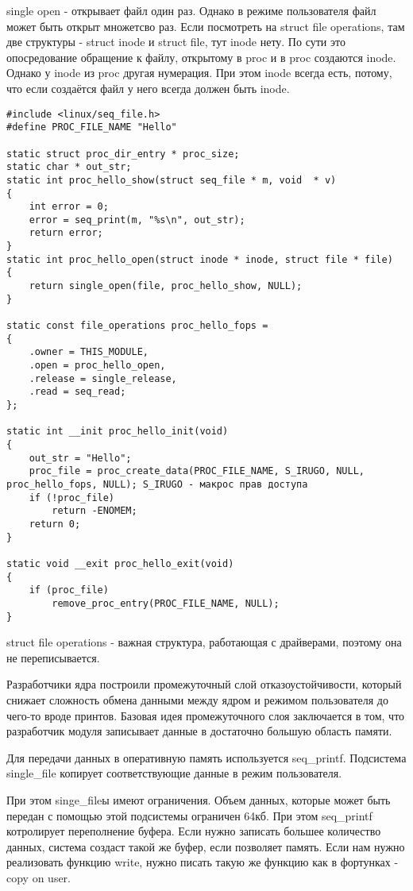 single open - открывает файл один раз. Однако в режиме пользователя файл может быть открыт множетсво раз. Если посмотреть на struct file operations, там две структуры - struct inode и struct file, тут inode нету. По сути это опосредование обращение к файлу, открытому в proc и в proc создаются inode. Однако у inode из proc другая нумерация. При этом inode всегда есть, потому, что если создаётся файл у него всегда должен быть inode.

\begin{lstlisting}
#include <linux/seq_file.h>
#define PROC_FILE_NAME "Hello"

static struct proc_dir_entry * proc_size;
static char * out_str;
static int proc_hello_show(struct seq_file * m, void  * v)
{
	int error = 0;
	error = seq_print(m, "%s\n", out_str);
	return error;
}
static int proc_hello_open(struct inode * inode, struct file * file)
{
	return single_open(file, proc_hello_show, NULL);
}

static const file_operations proc_hello_fops = 
{
	.owner = THIS_MODULE,
	.open = proc_hello_open,
	.release = single_release,
	.read = seq_read;
};

static int __init proc_hello_init(void)
{
	out_str = "Hello";
	proc_file = proc_create_data(PROC_FILE_NAME, S_IRUGO, NULL, proc_hello_fops, NULL); S_IRUGO - макрос прав доступа
	if (!proc_file)
		return -ENOMEM;
	return 0;
}

static void __exit proc_hello_exit(void)
{
	if (proc_file)
		remove_proc_entry(PROC_FILE_NAME, NULL);
}
\end{lstlisting}

struct file operations - важная структура, работающая с драйверами, поэтому она не переписывается.

Разработчики ядра построили промежуточный слой отказоустойчивости, который снижает сложность обмена данными между ядром и режимом пользователя до чего-то вроде принтов. Базовая идея промежуточного слоя заключается в том, что разработчик модуля записывает данные в достаточно большую область памяти. 

Для передачи данных в оперативную память используется seq\_printf. Подсистема single\_file копирует соответствующие данные в режим пользователя.

При этом singe\_fileы имеют ограничения. Объем данных, которые может быть передан с помощью этой подсистемы ограничен 64кб. При этом seq\_printf котролирует переполнение буфера. Если нужно записать большее количество данных, система создаст такой же буфер, если позволяет память. Если нам нужно реализовать функцию write, нужно писать такую же функцию как в фортунках - copy on user.